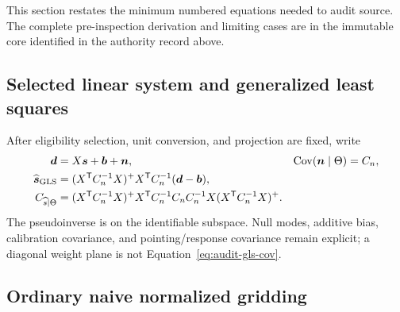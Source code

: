 \documentclass[11pt]{article}
\newcommand{\Cov}{\operatorname{Cov}}
\begin{document}
This section restates the minimum numbered equations needed to audit source.
The complete pre-inspection derivation and limiting cases are in the immutable
core identified in the authority record above.

\subsection{Selected linear system and generalized least squares}

After eligibility selection, unit conversion, and projection are fixed, write
\begin{align}
  \boldsymbol d &= X\boldsymbol s+\boldsymbol b+\boldsymbol n,
  &\Cov(\boldsymbol n\mid\Theta)&=C_n,
  \label{eq:audit-selected-system}\\
  \widehat{\boldsymbol s}_{\rm GLS}
    &= (X^{\mathsf T}C_n^{-1}X)^{+}
       X^{\mathsf T}C_n^{-1}(\boldsymbol d-\boldsymbol b),
  \label{eq:audit-gls}\\
  C_{\widehat s\mid\Theta}
    &= (X^{\mathsf T}C_n^{-1}X)^{+}
       X^{\mathsf T}C_n^{-1}C_n C_n^{-1}X
       (X^{\mathsf T}C_n^{-1}X)^{+}.
  \label{eq:audit-gls-cov}
\end{align}
The pseudoinverse is on the identifiable subspace.  Null modes, additive bias,
calibration covariance, and pointing/response covariance remain explicit; a
diagonal weight plane is not Equation~\eqref{eq:audit-gls-cov}.

\subsection{Ordinary naive normalized gridding}
\end{document}
